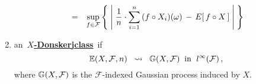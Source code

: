\begin{definition}
\begin{enumerate}
\begin{eqnarray*}
	\\
	& = &
		\underset{f\in\mathcal{F}}{\sup}\left\{\;
			\left\vert\;
				\dfrac{1}{n}\cdot \overset{n}{\underset{i=1}{\sum}}\,(f \circ X_{i})(\omega)
				\,\overset{{\color{white}+}}{-}\,
				E[\,f \circ X\,]
			\;\right\vert
		\;\right\}
	\end{eqnarray*}
\item
	an \,\underline{\textbf{$X$-Donsker{\color{white}j}class}}\, if
	\begin{equation*}
	\mathbb{E}(X,\mathcal{F},n) \;\;\rightsquigarrow\;\; \mathbb{G}(X,\mathcal{F})
	\;\;\textnormal{in \;$l^{\infty}(\mathcal{F})$}\,,
	\end{equation*}
	where $\mathbb{G}(X,\mathcal{F})$ is the $\mathcal{F}$-indexed Gaussian process induced by $X$.
\end{enumerate}
\end{definition}


\renewcommand{\theenumi}{\roman{enumi}}
\renewcommand{\labelenumi}{\textnormal{(\theenumi)}$\;\;$}

